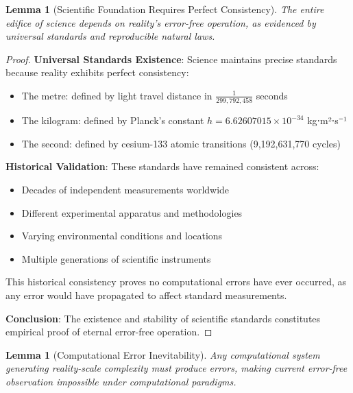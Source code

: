 \documentclass[12pt,a4paper]{article}
\newtheorem{lemma}[theorem]{Lemma}
\begin{document}
\begin{lemma}[Scientific Foundation Requires Perfect Consistency]
The entire edifice of science depends on reality's error-free operation, as evidenced by universal standards and reproducible natural laws.
\end{lemma}

\begin{proof}
\textbf{Universal Standards Existence}: Science maintains precise standards because reality exhibits perfect consistency:
\begin{itemize}
    \item The metre: defined by light travel distance in $\frac{1}{299,792,458}$ seconds
    \item The kilogram: defined by Planck's constant $h = 6.62607015 \times 10^{-34}$ kg⋅m²⋅s⁻¹
    \item The second: defined by cesium-133 atomic transitions (9,192,631,770 cycles)
\end{itemize}

\textbf{Historical Validation}: These standards have remained consistent across:
\begin{itemize}
    \item Decades of independent measurements worldwide
    \item Different experimental apparatus and methodologies
    \item Varying environmental conditions and locations
    \item Multiple generations of scientific instruments
\end{itemize}

This historical consistency proves no computational errors have ever occurred, as any error would have propagated to affect standard measurements.

\textbf{Conclusion}: The existence and stability of scientific standards constitutes empirical proof of eternal error-free operation.
\end{proof}

\begin{lemma}[Computational Error Inevitability]
Any computational system generating reality-scale complexity must produce errors, making current error-free observation impossible under computational paradigms.
\end{lemma}
\end{document}
